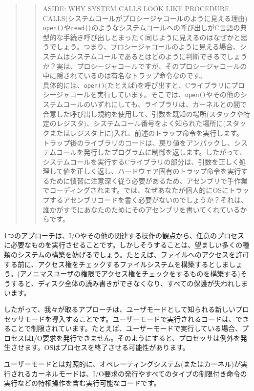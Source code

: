\begin{quote}
\begin{quote}
ASIDE: WHY SYSTEM CALLS LOOK LIKE PROCEDURE
CALLS(システムコールがプロシージャコールのように見える理由)\\
\texttt{open()}や\texttt{read()}のようなシステムコールへの呼び出しがC言語の典型的な手続き呼び出しとまったく同じように見えるのはなぜかと思うでしょう。つまり、プロシージャコールのように見える場合、システムはシステムコールであるとはどのように判断できるでしょうか？実は、プロシージャコールですが、そのプロシージャコールの中に隠されているのは有名なトラップ命令なのです。\\
具体的には、\texttt{open()}(たとえば)を呼び出すと、Cライブラリにプロシージャコールを実行しています。そこでは、\texttt{open()}やその他のシステムコールのいずれにしても、ライブラリは、カーネルとの間で合意した呼び出し規約を使用して、引数を既知の場所(スタックや特定のレジスタ)、システムコール番号をよく知られた場所に(スタックまたはレジスタ上に)入れ、前述のトラップ命令を実行します。\\
トラップ後のライブラリのコードは、戻り値をアンパックし、システムコールを発行したプログラムに制御を返します。したがって、システムコールを実行するCライブラリの部分は、引数を正しく処理して値を正しく返し、ハードウェア固有のトラップ命令を実行するために慣習に注意深く従う必要があるため、アセンブリで手作業でコーディングされます。では、なぜあなたが個人的にOSにトラップするアセンブリコードを書く必要がないのでしょうか？それは、誰かがすでにあなたのためにそのアセンブリを書いてくれているからです。
\end{quote}
\end{quote}

1つのアプローチは、I/Oやその他の関連する操作の観点から、任意のプロセスに必要なものを実行させることです。しかしそうすることは、望ましい多くの種類のシステムの構築を妨げるでしょう。たとえば、ファイルへのアクセスを許可する前に、アクセス権をチェックするファイルシステムを構築するとしましょう。(アノニマスユーザの権限でアクセス権をチェックをするものを構築する)そうすると、ディスク全体の読み書きができなくなり、すべての保護が失われしまいます。

したがって、我々が取るアプローチは、ユーザモードとして知られる新しいプロセッサモードを導入することです。ユーザーモードで実行されるコードは、できることで制限されています。たとえば、ユーザーモードで実行している場合、プロセスはI/O要求を発行できません。そのようにすると、プロセッサは例外を発生させます。OSはプロセスを終了させる可能性があります。

ユーザーモードとは対照的に、オペレーティングシステム(またはカーネル)が実行されるカーネルモードは、I/O要求の発行やすべてのタイプの制限付き命令の実行などの特権操作を含む実行可能なコードです。

